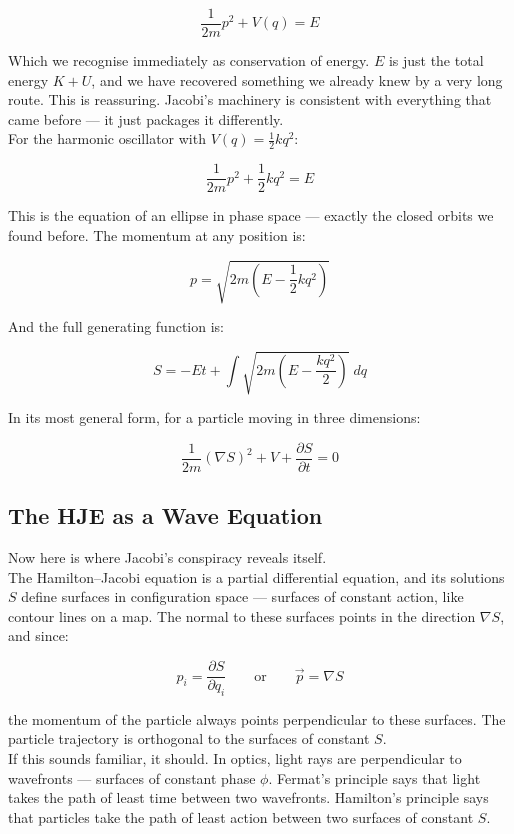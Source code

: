 \documentclass[krantz1,ChapterTOCs]{krantz}
\begin{document}
\[
\boxed{\frac{1}{2m}p^2 + V(q) = E}
\]

Which we recognise immediately as conservation of energy. $E$ is 
just the total energy $K + U$, and we have recovered something we 
already knew by a very long route. This is reassuring. Jacobi's 
machinery is consistent with everything that came before --- it just 
packages it differently.\\

For the harmonic oscillator with $V(q) = \frac{1}{2}kq^2$:

\[
\boxed{\frac{1}{2m}p^2 + \frac{1}{2}kq^2 = E}
\]

This is the equation of an ellipse in phase space --- exactly the 
closed orbits we found before. The momentum at any position is:

\[
p = \sqrt{2m\left(E - \frac{1}{2}kq^2\right)}
\]

And the full generating function is:

\[
S = -Et + \int\sqrt{2m\left(E - \frac{kq^2}{2}\right)}\;dq
\]

In its most general form, for a particle moving in three dimensions:

\[
\boxed{\frac{1}{2m}(\nabla S)^2 + V + \frac{\partial S}{\partial t} 
= 0}
\]

\subsection*{The HJE as a Wave Equation}

Now here is where Jacobi's conspiracy reveals itself.\\

The Hamilton--Jacobi equation is a partial differential equation, 
and its solutions $S$ define surfaces in configuration space --- 
surfaces of constant action, like contour lines on a map. The normal 
to these surfaces points in the direction $\nabla S$, and since:

\[
p_i = \frac{\partial S}{\partial q_i} \qquad \text{or} \qquad 
\vec{p} = \nabla S
\]

the momentum of the particle always points perpendicular to these 
surfaces. The particle trajectory is orthogonal to the surfaces of 
constant $S$.\\

If this sounds familiar, it should. In optics, light rays are 
perpendicular to wavefronts --- surfaces of constant phase $\phi$. 
Fermat's principle says that light takes the path of least time 
between two wavefronts. Hamilton's principle says that particles take 
the path of least action between two surfaces of constant $S$.\\
\end{document}
